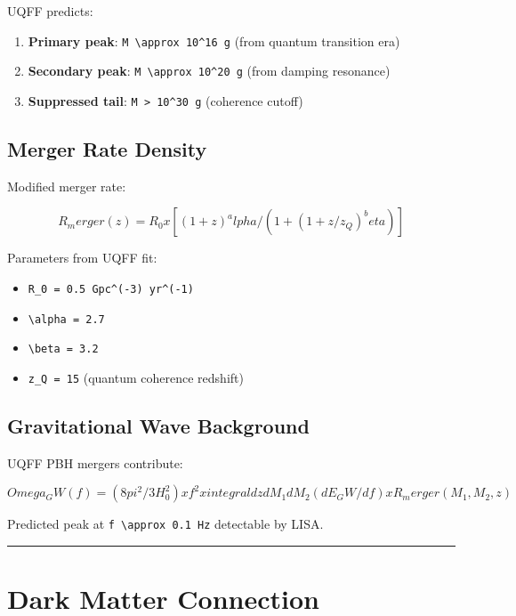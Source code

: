 \documentclass[12pt,a4paper]{article}
\begin{document}
UQFF predicts:

\begin{enumerate}
  \item \textbf{Primary peak}: \texttt{M \textbackslash approx 10\^{}16 g} (from quantum transition era)
  \item \textbf{Secondary peak}: \texttt{M \textbackslash approx 10\^{}20 g} (from damping resonance)
  \item \textbf{Suppressed tail}: \texttt{M > 10\^{}30 g} (coherence cutoff)
\end{enumerate}

\subsection{Merger Rate Density}

Modified merger rate:

\begin{equation}
R_merger(z) = R_0 x [(1+z)^alpha / (1 + (1+z/z_Q)^beta)]
\end{equation}

Parameters from UQFF fit:

\begin{itemize}
  \item \texttt{R\_0 = 0.5 Gpc\^{}(-3) yr\^{}(-1)}
  \item \texttt{\textbackslash alpha = 2.7}
  \item \texttt{\textbackslash beta = 3.2}
  \item \texttt{z\_Q = 15} (quantum coherence redshift)
\end{itemize}

\subsection{Gravitational Wave Background}

UQFF PBH mergers contribute:

\begin{equation}
Omega_GW(f) = (8pi^2/3H_0^2) x f^2 x integral dz dM_1 dM_2 (dE_GW/df) x R_merger(M_1,M_2,z)
\end{equation}

Predicted peak at \texttt{f \textbackslash approx 0.1 Hz} detectable by LISA.

\medskip\hrule\medskip

\section{Dark Matter Connection}
\end{document}
